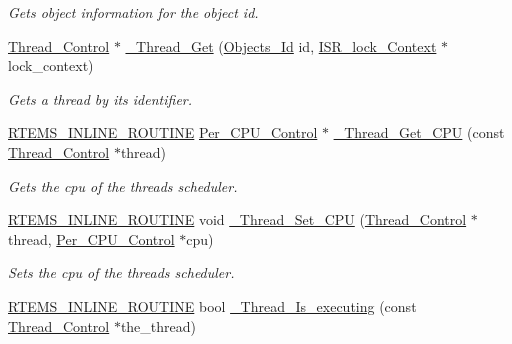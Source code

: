 \begin{DoxyCompactItemize}
\begin{DoxyCompactList}\small\item\em Gets object information for the object id. \end{DoxyCompactList}\item 
\mbox{\hyperlink{struct__Thread__Control}{Thread\+\_\+\+Control}} $\ast$ \mbox{\hyperlink{group__RTEMSScoreThread_gadc33b4b428dfc134ae1622441433b1a1}{\+\_\+\+Thread\+\_\+\+Get}} (\mbox{\hyperlink{group__RTEMSScoreObject_ga5821f52a51072941bdd603e542d0863e}{Objects\+\_\+\+Id}} id, \mbox{\hyperlink{structISR__lock__Context}{I\+S\+R\+\_\+lock\+\_\+\+Context}} $\ast$lock\+\_\+context)
\begin{DoxyCompactList}\small\item\em Gets a thread by its identifier. \end{DoxyCompactList}\item 
\mbox{\hyperlink{group__RTEMSScoreBaseDefs_gac216239df231d5dbd15e3520b0b9313f}{R\+T\+E\+M\+S\+\_\+\+I\+N\+L\+I\+N\+E\+\_\+\+R\+O\+U\+T\+I\+NE}} \mbox{\hyperlink{structPer__CPU__Control}{Per\+\_\+\+C\+P\+U\+\_\+\+Control}} $\ast$ \mbox{\hyperlink{group__RTEMSScoreThread_ga04310043b907712ed8693fbbbc6ba0be}{\+\_\+\+Thread\+\_\+\+Get\+\_\+\+C\+PU}} (const \mbox{\hyperlink{struct__Thread__Control}{Thread\+\_\+\+Control}} $\ast$thread)
\begin{DoxyCompactList}\small\item\em Gets the cpu of the thread\textquotesingle{}s scheduler. \end{DoxyCompactList}\item 
\mbox{\hyperlink{group__RTEMSScoreBaseDefs_gac216239df231d5dbd15e3520b0b9313f}{R\+T\+E\+M\+S\+\_\+\+I\+N\+L\+I\+N\+E\+\_\+\+R\+O\+U\+T\+I\+NE}} void \mbox{\hyperlink{group__RTEMSScoreThread_ga47858fc4679031e1dedcc3188fd79589}{\+\_\+\+Thread\+\_\+\+Set\+\_\+\+C\+PU}} (\mbox{\hyperlink{struct__Thread__Control}{Thread\+\_\+\+Control}} $\ast$thread, \mbox{\hyperlink{structPer__CPU__Control}{Per\+\_\+\+C\+P\+U\+\_\+\+Control}} $\ast$cpu)
\begin{DoxyCompactList}\small\item\em Sets the cpu of the thread\textquotesingle{}s scheduler. \end{DoxyCompactList}\item 
\mbox{\hyperlink{group__RTEMSScoreBaseDefs_gac216239df231d5dbd15e3520b0b9313f}{R\+T\+E\+M\+S\+\_\+\+I\+N\+L\+I\+N\+E\+\_\+\+R\+O\+U\+T\+I\+NE}} bool \mbox{\hyperlink{group__RTEMSScoreThread_gad103869e6afbe9aa2516d18ffd7e4190}{\+\_\+\+Thread\+\_\+\+Is\+\_\+executing}} (const \mbox{\hyperlink{struct__Thread__Control}{Thread\+\_\+\+Control}} $\ast$the\+\_\+thread)

\end{DoxyCompactItemize}
